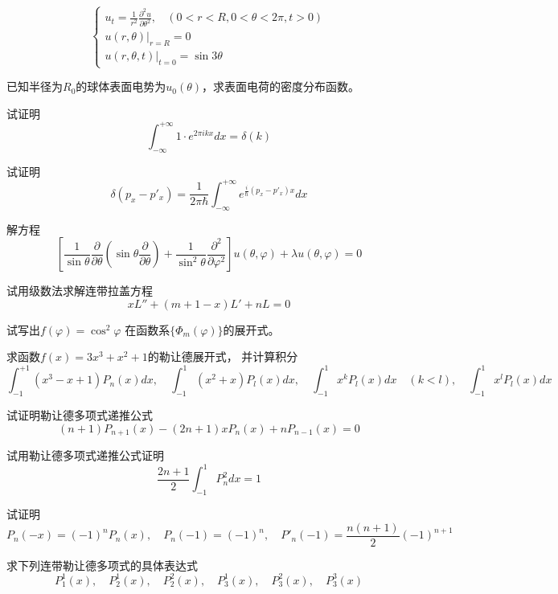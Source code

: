 \begin{Exercises}
		$$\begin{cases}
			\displaystyle u_t= \frac{1}{r^2 } \frac{\partial ^2 u }{\partial \theta ^2
			}, ~~~~ (0<r<R, 0<\theta<2\pi, t>0)\\
			u(r,\theta)|_{r=R}=0 	\\
			u(r,\theta,t)|_{t=0} = \sin 3\theta 	
		\end{cases} $$
		\item 已知半径为$R_0$的球体表面电势为$u_0(\theta)$，求表面电荷的密度分布函数。
		\item 试证明
	 \[
	  \int_{-\infty}^{+\infty} 1 \cdot e^{2\pi i kx} d x = \delta(k)
	 \]
		\item 试证明\[\delta(p_x-p'_x) = \frac{1}{2\pi\hbar} \int_{-\infty}^{+\infty} e^{\frac{i}{\hbar}(p_x-p'_x) x}  dx\]
		\item 解方程	
		\begin{equation*}
			\left[
			\frac{1}{\sin \theta  } \frac{\partial }{\partial \theta } (\sin \theta \frac{\partial }{\partial \theta } )
			+\frac{1}{ \sin^2 \theta  } \frac{\partial^2}{\partial\varphi ^2}\right]  u (\theta, \varphi) +\lambda u (\theta, \varphi) =0 
		\end{equation*}
		\item 试用级数法求解连带拉盖方程
		\begin{equation*}
			x L''  + (m+1 -x) L' +n L =0
		\end{equation*}	
		\item 试写出$f(\varphi) = \cos ^2 \varphi$  在函数系$\{ \Phi _m(\varphi)\}$的展开式。
		\item 求函数$f(x) = 3x^3+x^2+1$的勒让德展开式， 并计算积分  $$ \int_{-1}^{+1} (x^3 -x +1) P_{n}(x) dx, \quad \int_{-1}^{1} (x^2+x) P_l(x) dx, \quad \int_{-1}^{1} x^k P_l(x) dx \quad(k<l), \quad  	\int_{-1}^{1} x^l P_l(x) dx $$ 
		\item 试证明勒让德多项式递推公式
		\begin{equation*}
			(n+1) P_{n+1}(x)-(2 n+1) x P_{n}(x)+n P_{n-1}(x)=0
		\end{equation*}
		\item 试用勒让德多项式递推公式证明
		\begin{equation*}
			\frac{2n+1}{2}\int_{-1}^{1}  P ^2 _{n} dx = 1 
	\end{equation*}	
		\item 试证明 	
	\[P _{n}(-x) =(-1)^n P _{n}(x),\quad P _{n}(-1) =(-1)^n, \quad P'_{n}(-1) = \frac{n(n+1)}{2}(-1)^{n+1} \] 
		\item 求下列连带勒让德多项式的具体表达式
	$$P^1 _{1}(x),\quad P^1 _{2}(x),\quad P^2 _{2}(x),\quad P^1 _{3}(x),\quad P^2 _{3}(x),\quad  P^3 _{3}(x)$$

\end{Exercises}
